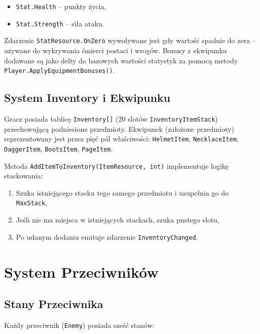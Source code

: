 \begin{itemize}
    \item \texttt{Stat.Health} – punkty życia,
    \item \texttt{Stat.Strength} – siła ataku.
\end{itemize}

Zdarzenie \texttt{StatResource.OnZero} wywoływane jest gdy wartość spadnie do zera – używane do wykrywania śmierci postaci i wrogów. Bonusy z ekwipunku dodawane są jako delty do bazowych wartości statystyk za pomocą metody \texttt{Player.ApplyEquipmentBonuses()}.

\subsection{System Inventory i Ekwipunku}

Gracz posiada tablicę \texttt{Inventory[]} (20 slotów \texttt{InventoryItemStack}) przechowującą podniesione przedmioty. Ekwipunek (założone przedmioty) reprezentowany jest przez pięć pól właściwości: \texttt{HelmetItem}, \texttt{NecklaceItem}, \texttt{DaggerItem}, \texttt{BootsItem}, \texttt{PageItem}.

Metoda \texttt{AddItemToInventory(ItemResource, int)} implementuje logikę stackowania:
\begin{enumerate}
    \item Szuka istniejącego stacku tego samego przedmiotu i uzupełnia go do \texttt{MaxStack},
    \item Jeśli nie ma miejsca w istniejących stackach, szuka pustego slotu,
    \item Po udanym dodaniu emituje zdarzenie \texttt{InventoryChanged}.
\end{enumerate}

\section{System Przeciwników}

\subsection{Stany Przeciwnika}

Każdy przeciwnik (\texttt{Enemy}) posiada sześć stanów:

